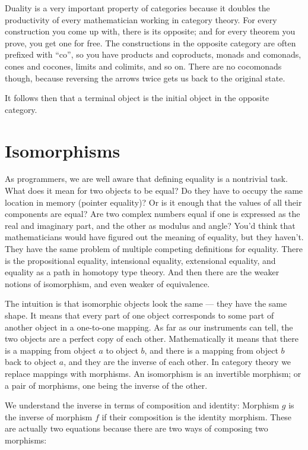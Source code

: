 Duality is a very important property of categories because it doubles
the productivity of every mathematician working in category theory. For
every construction you come up with, there is its opposite; and for
every theorem you prove, you get one for free. The constructions in the
opposite category are often prefixed with ``co'', so you have products
and coproducts, monads and comonads, cones and cocones, limits and
colimits, and so on. There are no cocomonads though, because reversing
the arrows twice gets us back to the original state.

It follows then that a terminal object is the initial object in the
opposite category.

\section{Isomorphisms}

As programmers, we are well aware that defining equality is a nontrivial
task. What does it mean for two objects to be equal? Do they have to
occupy the same location in memory (pointer equality)? Or is it enough
that the values of all their components are equal? Are two complex
numbers equal if one is expressed as the real and imaginary part, and
the other as modulus and angle? You'd think that mathematicians would
have figured out the meaning of equality, but they haven't. They have
the same problem of multiple competing definitions for equality. There
is the propositional equality, intensional equality, extensional
equality, and equality as a path in homotopy type theory. And then there
are the weaker notions of isomorphism, and even weaker of equivalence.

The intuition is that isomorphic objects look the same --- they have the
same shape. It means that every part of one object corresponds to some
part of another object in a one-to-one mapping. As far as our
instruments can tell, the two objects are a perfect copy of each other.
Mathematically it means that there is a mapping from object $a$ to
object $b$, and there is a mapping from object $b$ back to
object $a$, and they are the inverse of each other. In category
theory we replace mappings with morphisms. An isomorphism is an
invertible morphism; or a pair of morphisms, one being the inverse of
the other.

We understand the inverse in terms of composition and identity: Morphism
$g$ is the inverse of morphism $f$ if their composition is the
identity morphism. These are actually two equations because there are
two ways of composing two morphisms:

